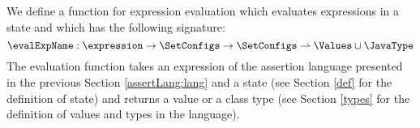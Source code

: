  

%
%                                                     
%                                          
%                                       

 
We define a function for expression evaluation
 which evaluates expressions in a state and which has the following signature:
$$
\evalExpName : \expression \rightarrow \SetConfigs  \rightarrow \SetConfigs  \rightharpoonup  \Values \cup \JavaType
$$
The evaluation function   takes  an expression of the assertion language presented in the previous Section 
\ref{assertLang:lang} and a state (see Section \ref{def} for the definition of state)  and returns a value or a class type
(see Section \ref{types} for the definition of values and types in the language). 


